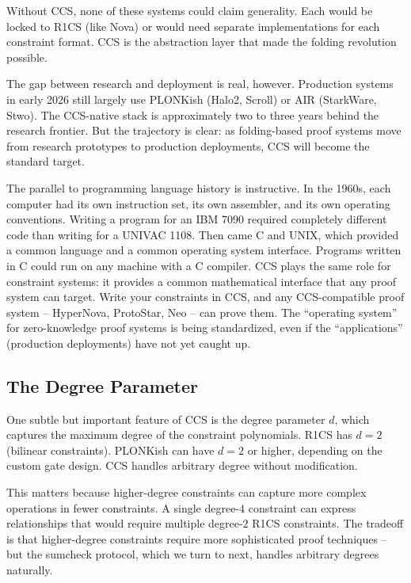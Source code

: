 \documentclass[
  11pt,
  openany]{report}
\begin{document}
Without CCS, none of these systems could claim generality. Each would be locked
to R1CS (like Nova) or would need separate implementations for each constraint
format. CCS is the abstraction layer that made the folding revolution possible.

The gap between research and deployment is real, however. Production systems in
early 2026 still largely use PLONKish (Halo2, Scroll) or AIR (StarkWare, Stwo).
The CCS-native stack is approximately two to three years behind the research
frontier. But the trajectory is clear: as folding-based proof systems move from
research prototypes to production deployments, CCS will become the standard
target.

The parallel to programming language history is instructive. In the 1960s, each
computer had its own instruction set, its own assembler, and its own operating
conventions. Writing a program for an IBM 7090 required completely different
code than writing for a UNIVAC 1108. Then came C and UNIX, which provided a
common language and a common operating system interface. Programs written in C
could run on any machine with a C compiler. CCS plays the same role for
constraint systems: it provides a common mathematical interface that any proof
system can target. Write your constraints in CCS, and any CCS-compatible proof
system -- HyperNova, ProtoStar, Neo -- can prove them. The ``operating system''
for zero-knowledge proof systems is being standardized, even if the
``applications'' (production deployments) have not yet caught up.

\subsection{The Degree Parameter}\label{the-degree-parameter}

One subtle but important feature of CCS is the degree parameter \(d\), which
captures the maximum degree of the constraint polynomials. R1CS has \(d = 2\)
(bilinear constraints). PLONKish can have \(d = 2\) or higher, depending on the
custom gate design. CCS handles arbitrary degree without modification.

This matters because higher-degree constraints can capture more complex
operations in fewer constraints. A single degree-\(4\) constraint can express
relationships that would require multiple degree-\(2\) R1CS constraints. The
tradeoff is that higher-degree constraints require more sophisticated proof
techniques -- but the sumcheck protocol, which we turn to next, handles
arbitrary degrees naturally.
\end{document}
